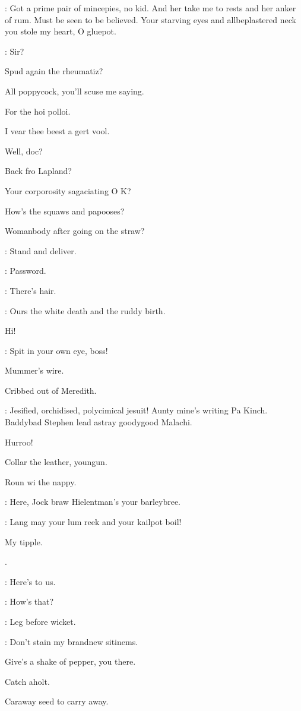 \dixon:
Got a prime pair of mincepies,
no kid.
And her take me to rests and her anker of rum.
Must be seen to be believed.
Your starving eyes and allbeplastered neck you stole my heart,
O gluepot.

\barman:
Sir?

Spud again the rheumatiz?

All poppycock,
you'll scuse me saying.

For the hoi polloi.

I vear thee beest a gert vool.

Well,
doc?

Back fro Lapland?

Your corporosity sagaciating O K?

How's the squaws and papooses?

Womanbody after going on the straw?

\lenehan:
Stand and deliver.

\crotthers:
Password.

\punch:
There's hair.

\Bloom:
Ours the white death and the ruddy birth.

Hi!

\bannon:
Spit in your own eye,
boss!

Mummer's wire.

Cribbed out of Meredith.

\mulligan:
Jesified,
orchidised,
polycimical jesuit!
Aunty mine's writing Pa Kinch.
Baddybad Stephen lead astray goodygood Malachi.


Hurroo!

Collar the leather,
youngun.

Roun wi the nappy.

\lenehan:
Here,
Jock braw Hielentman's your barleybree.

\crotthers:
Lang may your lum reek and your kailpot boil!

My tipple.

.

\dixon:
Here's to us.

\madden:
How's that?

\lynch:
Leg before wicket.

\mulligan:
Don't stain my brandnew sitinems.

Give's a shake of pepper,
you there.

Catch aholt.

Caraway seed to carry away.

